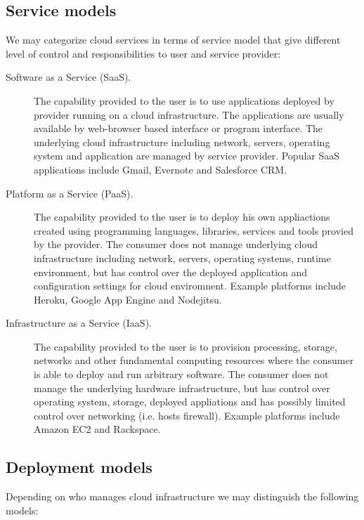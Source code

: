 \subsection{Service models}

We may categorize cloud services in terms of service model that give different level of control and responsibilities to user and service provider:

\begin{description}
  \item[Software as a Service (SaaS).] The capability provided to the user is to use applications deployed by provider running on a cloud infrastructure. The applications are usually available by web-browser based interface or program interface. The underlying cloud infrastructure including network, servers, operating system and application are managed by service provider. Popular SaaS applications include Gmail, Evernote and Salesforce CRM.
  \item[Platform as a Service (PaaS).] The capability provided to the user is to deploy his own appliactions created using programming languages, libraries, services and tools provied by the provider. The consumer does not manage underlying cloud infrastructure including network, servers, operating systems, runtime environment, but has control over the deployed application and configuration settings for cloud enviromnent. Example platforms include Heroku, Google App Engine and Nodejitsu.
  \item[Infrastructure as a Service (IaaS).] The capability provided to the user is to provision processing, storage, networks and other fundamental computing resources where the consumer is able to deploy and run arbitrary software. The consumer does not manage the underlying hardware infrastructure, but has control over operating system, storage, deployed appliations and has possibly limited control over networking (i.e. hosts firewall). Example platforms include Amazon EC2 and Rackspace.
\end{description}

\subsection{Deployment models}

Depending on who manages cloud infrastructure we may distinguish the following models:

